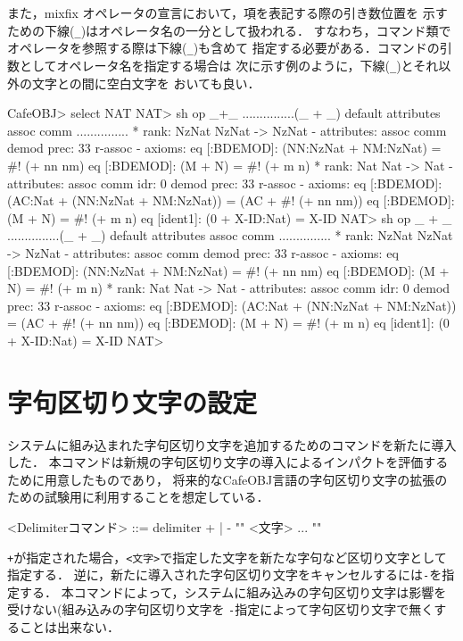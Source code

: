 \documentclass[a4paper,oneside,10pt]{memoir}
\newenvironment{vvtm}%
{\parskip=0pt\lineskip=0pt\begin{center}\begin{minipage}{0.8\textwidth}\begin{snugshade}}%
  {\end{snugshade}\end{minipage}\end{center}}
\begin{document}
また，mixfix オペレータの宣言において，項を表記する際の引き数位置を%
示すための下線(\verb|_|)はオペレータ名の一分として扱われる．
すなわち，コマンド類でオペレータを参照する際は下線(\verb|_|)も含めて%
指定する必要がある．コマンドの引数としてオペレータ名を指定する場合は%
次に示す例のように，下線(\verb|_|)とそれ以外の文字との間に空白文字を%
おいても良い．
\begin{vvtm}
\begin{simplev}
CafeOBJ> select NAT
NAT> sh op _+_
...............(_ + _) default attributes { assoc comm }...............
  * rank: NzNat NzNat -> NzNat
  - attributes:  { assoc comm demod prec: 33 r-assoc }
    - axioms:
      eq [:BDEMOD]: (NN:NzNat + NM:NzNat)
       = #! (+ nn nm)
      eq [:BDEMOD]: (M + N) = #! (+ m n)
  * rank: Nat Nat -> Nat
  - attributes:  { assoc comm idr: 0 demod prec: 33 r-assoc }
    - axioms:
      eq [:BDEMOD]: (AC:Nat + (NN:NzNat + NM:NzNat))
       = (AC + #! (+ nn nm))
      eq [:BDEMOD]: (M + N) = #! (+ m n)
      eq [ident1]: (0 + X-ID:Nat) = X-ID
NAT> sh op _ + _
...............(_ + _) default attributes { assoc comm }...............
  * rank: NzNat NzNat -> NzNat
  - attributes:  { assoc comm demod prec: 33 r-assoc }
    - axioms:
      eq [:BDEMOD]: (NN:NzNat + NM:NzNat)
       = #! (+ nn nm)
      eq [:BDEMOD]: (M + N) = #! (+ m n)
  * rank: Nat Nat -> Nat
  - attributes:  { assoc comm idr: 0 demod prec: 33 r-assoc }
    - axioms:
      eq [:BDEMOD]: (AC:Nat + (NN:NzNat + NM:NzNat))
       = (AC + #! (+ nn nm))
      eq [:BDEMOD]: (M + N) = #! (+ m n)
      eq [ident1]: (0 + X-ID:Nat) = X-ID
NAT> 
\end{simplev}
\end{vvtm}

\section{字句区切り文字の設定}
システムに組み込まれた字句区切り文字を追加するためのコマンドを新たに導入した．
本コマンドは新規の字句区切り文字の導入によるインパクトを評価するために用意したものであり，
将来的なCafeOBJ言語の字句区切り文字の拡張のための試験用に利用することを想定している．
\begin{vvtm}
\begin{simplev}
<Delimiterコマンド> ::= delimiter { + | - } "{" <文字> ... "}"
\end{simplev}
\end{vvtm}
\texttt{+}が指定された場合，\texttt{<文字>}で指定した文字を新たな字句など区切り文字として指定する．
逆に，新たに導入された字句区切り文字をキャンセルするには\texttt{-}を指定する．
本コマンドによって，システムに組み込みの字句区切り文字は影響を受けない(組み込みの字句区切り文字を
\texttt{-}指定によって字句区切り文字で無くすることは出来ない．
\end{document}
